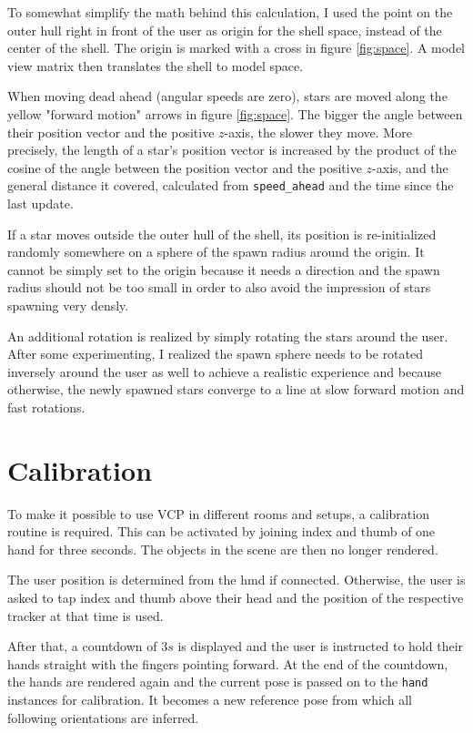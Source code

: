 \documentclass[hyperref, bachelorofscience]{cgvpub}
\begin{document}
To somewhat simplify the math behind this calculation, I used the point on the outer hull right in front of the user as origin for the shell space, instead of the center of the shell. The origin is marked with a cross in figure \ref{fig:space}. A model view matrix then translates the shell to model space. 

When moving dead ahead (angular speeds are zero), stars are moved along the yellow "forward motion" arrows in figure \ref{fig:space}. The bigger the angle between their position vector and the positive $ z $-axis, the slower they move. More precisely, the length of a star's position vector is increased by the product of the cosine of the angle between the position vector and the positive $ z $-axis, and the general distance it covered, calculated from \lstinline|speed_ahead| and the time since the last update.

If a star moves outside the outer hull of the shell, its position is re-initialized randomly somewhere on a sphere of the spawn radius around the origin. It cannot be simply set to the origin because it needs a direction and the spawn radius should not be too small in order to also avoid the impression of stars spawning very densly.

An additional rotation is realized by simply rotating the stars around the user. After some experimenting, I realized the spawn sphere needs to be rotated inversely around the user as well to achieve a realistic experience and because otherwise, the newly spawned stars converge to a line at slow forward motion and fast rotations.

\section{Calibration} \label{sec:cal}
To make it possible to use \gls{VCP} in different rooms and setups, a calibration routine is required. This can be activated by joining index and thumb of one hand for three seconds. The objects in the scene are then no longer rendered.

The user position is determined from the \acrshort{hmd} if connected. Otherwise, the user is asked to tap index and thumb above their head and the position of the respective tracker at that time is used.

After that, a countdown of $ 3s $ is displayed and the user is instructed to hold their hands straight with the fingers pointing forward. At the end of the countdown, the hands are rendered again and the current pose is passed on to the \lstinline|hand| instances for calibration. It becomes a new reference pose from which all following orientations are inferred. 
\end{document}
